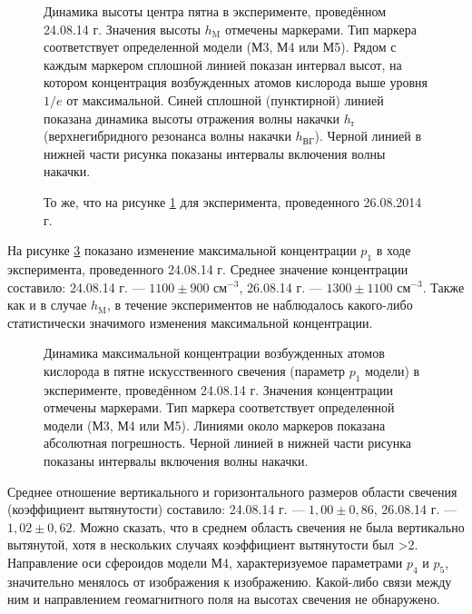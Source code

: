 \documentclass[12pt,a4paper]{article}
\begin{document}
\begin{figure}[h]
	\caption{Динамика высоты центра пятна в эксперименте, проведённом 24.08.14 г. Значения высоты $h_\text{M}$ отмечены маркерами. Тип маркера соответствует определенной модели (М3, М4 или М5). Рядом с каждым маркером сплошной линией показан интервал высот, на котором концентрация возбужденных атомов кислорода выше уровня $1/e$ от максимальной. Синей сплошной (пунктирной) линией показана динамика высоты отражения волны накачки $h_\text{r}$ (верхнегибридного резонанса волны накачки $h_\text{ВГ}$). Черной линией в нижней части рисунка показаны интервалы включения волны накачки.}
	\label{fig:fig8_1}
\end{figure}	

\begin{figure}[h]
	\caption{То же, что на рисунке \ref{fig:fig8_1} для эксперимента, проведенного 26.08.2014 г.}
	\label{fig:fig8_2}
\end{figure}	

На рисунке \ref{fig:fig9_1} показано изменение максимальной концентрации $p_1$ в ходе эксперимента, проведенного 24.08.14 г. Среднее значение концентрации составило: 24.08.14 г. --- $1100\pm900$ см$^{-3}$, 26.08.14 г. --- $1300\pm1100$ см$^{-3}$. Также как и в случае $h_\text{M}$, в течение экспериментов не наблюдалось какого-либо статистически значимого изменения максимальной концентрации.

\begin{figure}[h]
	\caption{Динамика максимальной концентрации возбужденных атомов кислорода в пятне искусственного свечения (параметр $p_1$ модели) в эксперименте, проведённом 24.08.14 г. Значения концентрации отмечены маркерами. Тип маркера соответствует определенной модели (М3, М4 или М5). Линиями около маркеров показана абсолютная погрешность. Черной линией в нижней части рисунка показаны интервалы включения волны накачки.}
	\label{fig:fig9_1}
\end{figure}

Среднее отношение вертикального и горизонтального размеров области свечения (коэффициент вытянутости) составило: 24.08.14 г. --- $1,00\pm0,86$, 26.08.14 г. --- $1,02\pm0,62$. Можно сказать, что в среднем область свечения не была вертикально вытянутой, хотя в нескольких случаях коэффициент вытянутости был >2. Направление оси сфероидов модели М4, характеризуемое параметрами $p_4$ и $p_5$, значительно менялось от изображения к изображению. Какой-либо связи между ним и направлением геомагнитного поля на высотах свечения не обнаружено. 
\end{document}
